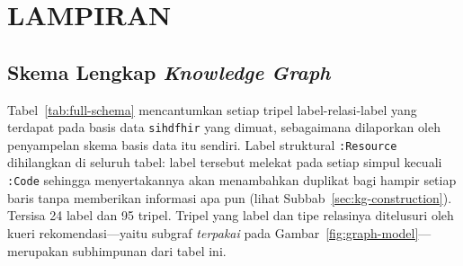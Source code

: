 \chapter*{LAMPIRAN}

\section{Skema Lengkap \emph{Knowledge Graph}}
\label{app:schema}

Tabel~\ref{tab:full-schema} mencantumkan setiap tripel label-relasi-label yang terdapat
pada basis data \texttt{sihdfhir} yang dimuat, sebagaimana dilaporkan oleh penyampelan skema
basis data itu sendiri. Label struktural \texttt{:Resource} dihilangkan di seluruh tabel:
label tersebut melekat pada setiap simpul kecuali \texttt{:Code} sehingga menyertakannya akan
menambahkan duplikat bagi hampir setiap baris tanpa memberikan informasi apa pun (lihat
Subbab~\ref{sec:kg-construction}). Tersisa 24 label dan 95 tripel. Tripel yang label dan tipe
relasinya ditelusuri oleh kueri rekomendasi---yaitu subgraf \emph{terpakai} pada
Gambar~\ref{fig:graph-model}---merupakan subhimpunan dari tabel ini.

